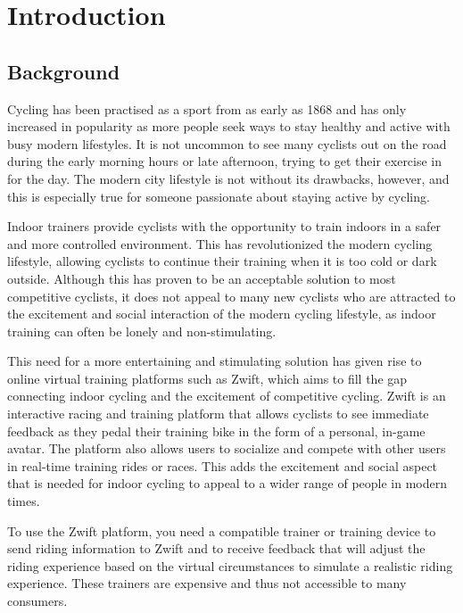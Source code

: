 
\chapter{Introduction}

\section{Background}
Cycling has been practised as a sport from as early as 1868 \citep{Britannica:2022} and has only increased in popularity as more people seek ways to stay healthy and active with busy modern lifestyles. It is not uncommon to see many cyclists out on the road during the early morning hours or late afternoon, trying to get their exercise in for the day. The modern city lifestyle is not without its drawbacks, however, and this is especially true for someone passionate about staying active by cycling.

Indoor trainers provide cyclists with the opportunity to train indoors in a safer and more controlled environment. This has revolutionized the modern cycling lifestyle, allowing cyclists to continue their training when it is too cold or dark outside. Although this has proven to be an acceptable solution to most competitive cyclists, it does not appeal to many new cyclists who are attracted to the excitement and social interaction of the modern cycling lifestyle, as indoor training can often be lonely and non-stimulating.

\newpage

This need for a more entertaining and stimulating solution has given rise to online virtual training platforms such as Zwift, which aims to fill the gap connecting indoor cycling and the excitement of competitive cycling. Zwift is an interactive racing and training platform that allows cyclists to see immediate feedback as they pedal their training bike in the form of a personal, in-game avatar. The platform also allows users to socialize and compete with other users in real-time training rides or races. This adds the excitement and social aspect that is needed for indoor cycling to appeal to a wider range of people in modern times.

To use the Zwift platform, you need a compatible trainer or training device to send riding information to Zwift and to receive feedback that will adjust the riding experience based on the virtual circumstances to simulate a realistic riding experience. These trainers are expensive and thus not accessible to many consumers.

